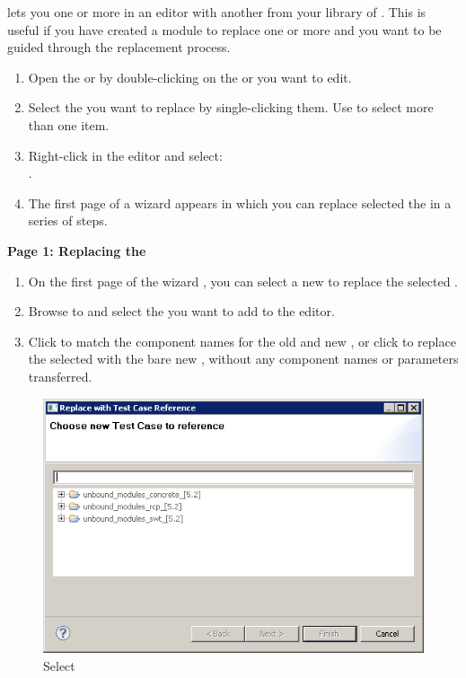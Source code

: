 
\app{} lets you  one or more \gdcases{} in an editor with another \gdcase{} from your library of \gdcases{}. This is useful if you have created a module to replace one or more \gdcases{} and you want to be guided through the replacement process.


\begin{enumerate}
\item Open the \gdtestcaseeditor{} or \gdtestsuiteeditor{} by double-clicking on the \gdcase{} or \gdsuite{} you  want to edit. 
\item Select the \gdcases{} you want to replace by single-clicking them. Use 
   to select more than one item. 
\item Right-click in the editor and  select: \\
.
\item The first page of a wizard appears in which you can replace selected the \gdcases{} in a series of steps. 
\end{enumerate}




\textbf{Page 1: Replacing the \gdcases{}}
\begin{enumerate}
\item On the first page of the wizard , you can select a  new  \gdcase{} to replace the selected \gdcases{}. 
\item Browse to and select the \gdcase{} you want to add to the editor.
\item Click  to match the component names for the old and new \gdcases{}, or click  to replace the selected \gdcases{} with the bare new \gdcase{}, without any component names or parameters transferred. 
\end{enumerate}

\begin{figure}[h]
\begin{center}
\includegraphics[width=12.5cm]{Tasks/Editors/PS/ReplaceTC_ChooseTC}
\caption{Select \gdcase{}}
\label{ReplaceTC-ChooseTC}
\end{center}
\end{figure} 


